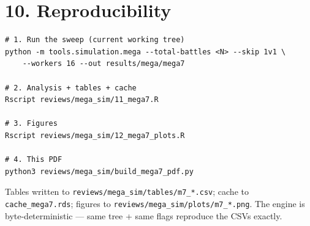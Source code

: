 \documentclass[10pt]{article}
\begin{document}
\section*{10. Reproducibility}

\begin{lstlisting}
# 1. Run the sweep (current working tree)
python -m tools.simulation.mega --total-battles <N> --skip 1v1 \
    --workers 16 --out results/mega/mega7

# 2. Analysis + tables + cache
Rscript reviews/mega_sim/11_mega7.R

# 3. Figures
Rscript reviews/mega_sim/12_mega7_plots.R

# 4. This PDF
python3 reviews/mega_sim/build_mega7_pdf.py
\end{lstlisting}

Tables written to \texttt{reviews/\allowbreak{}mega\_\allowbreak{}sim/\allowbreak{}tables/\allowbreak{}m7\_\allowbreak{}*.\allowbreak{}csv}; cache to \texttt{cache\_\allowbreak{}mega7.\allowbreak{}rds}; figures to \texttt{reviews/\allowbreak{}mega\_\allowbreak{}sim/\allowbreak{}plots/\allowbreak{}m7\_\allowbreak{}*.\allowbreak{}png}. The engine is byte-deterministic --- same tree + same flags reproduce the CSVs exactly.\\
\end{document}
